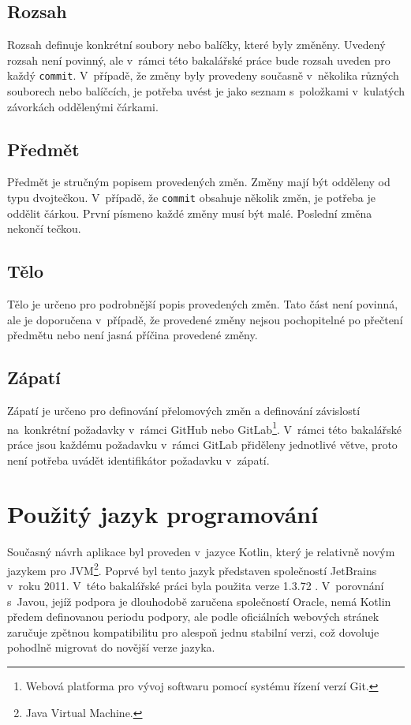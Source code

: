     \subsection{Rozsah}
        Rozsah definuje konkrétní soubory nebo balíčky, které byly změněny. Uvedený rozsah není povinný, ale v~rámci této bakalářské práce bude rozsah uveden pro každý \verb|commit|. V~případě, že změny byly provedeny současně v~několika různých souborech nebo balíčcích, je potřeba uvést je jako seznam s~položkami v~kulatých závorkách oddělenými čárkami.
    
    \subsection{Předmět}
        Předmět je stručným popisem provedených změn. Změny mají být odděleny od typu dvojtečkou. V~případě, že \verb|commit| obsahuje několik změn, je potřeba je oddělit čárkou. První písmeno každé změny musí být malé. Poslední změna nekončí tečkou.
    
    \subsection{Tělo}
        Tělo je určeno pro podrobnější popis provedených změn. Tato část není povinná, ale je doporučena v~případě, že provedené změny nejsou pochopitelné po přečtení předmětu nebo není jasná příčina provedené změny.
    
    \subsection{Zápatí}
        Zápatí je určeno pro definování přelomových změn a definování závislostí na~konkrétní požadavky v~rámci GitHub nebo GitLab\footnote{Webová platforma pro vývoj softwaru pomocí systému řízení verzí Git.}. V~rámci této bakalářské práce jsou každému požadavku v~rámci GitLab přiděleny jednotlivé větve, proto není potřeba uvádět identifikátor požadavku v~zápatí.
    
\section{Použitý jazyk programování}\label{resere:kotlin}
    Současný návrh aplikace byl proveden v~jazyce Kotlin, který je relativně novým jazykem pro JVM\footnote{Java Virtual Machine.}. Poprvé byl tento jazyk představen společností JetBrains v~roku 2011. V~této bakalářské práci byla použita verze 1.3.72 . V~porovnání s~Javou, jejíž podpora je dlouhodobě zaručena společností Oracle, nemá Kotlin předem definovanou periodu podpory, ale podle oficiálních webových stránek zaručuje zpětnou kompatibilitu pro alespoň jednu stabilní verzi, což dovoluje pohodlně migrovat do novější verze jazyka.\cite{java-support-period}\cite{kotlin-compatibility}
    
